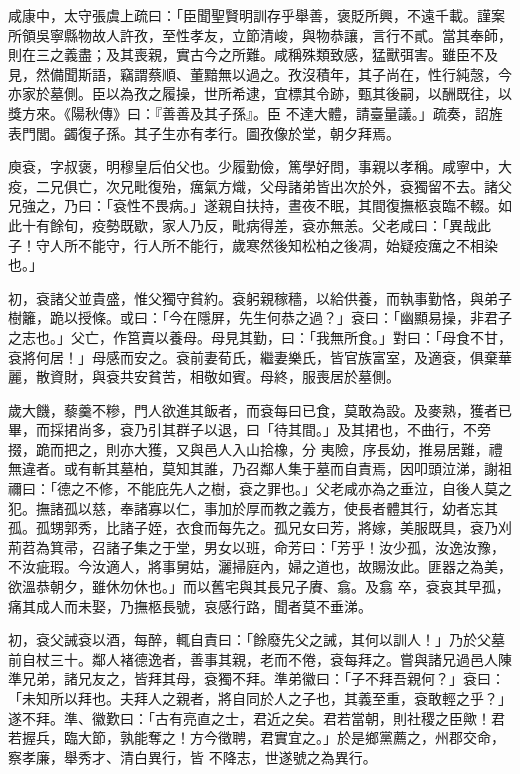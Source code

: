 \begin{pinyinscope}
 咸康中，太守張虞上疏曰：「臣聞聖賢明訓存乎舉善，褒貶所興，不遠千載。謹案所領吳寧縣物故人許孜，至性孝友，立節清峻，與物恭讓，言行不貳。當其奉師，則在三之義盡；及其喪親，實古今之所難。咸稱殊類致感，猛獸弭害。雖臣不及見，然備聞斯語，竊謂蔡順、董黯無以過之。孜沒積年，其子尚在，性行純愨，今亦家於墓側。臣以為孜之履操，世所希逮，宜標其令跡，甄其後嗣，以酬既往，以獎方來。《陽秋傳》曰：『善善及其子孫』。臣
 不達大體，請臺量議。」疏奏，詔旌表門閭。蠲復子孫。其子生亦有孝行。圖孜像於堂，朝夕拜焉。



 庾袞，字叔褒，明穆皇后伯父也。少履勤儉，篤學好問，事親以孝稱。咸寧中，大疫，二兄俱亡，次兄毗復殆，癘氣方熾，父母諸弟皆出次於外，袞獨留不去。諸父兄強之，乃曰：「袞性不畏病。」遂親自扶持，晝夜不眠，其間復撫柩哀臨不輟。如此十有餘旬，疫勢既歇，家人乃反，毗病得差，袞亦無恙。父老咸曰：「異哉此子！守人所不能守，行人所不能行，歲寒然後知松柏之後凋，始疑疫癘之不相染
 也。」



 初，袞諸父並貴盛，惟父獨守貧約。袞躬親稼穡，以給供養，而執事勤恪，與弟子樹籬，跪以授條。或曰：「今在隱屏，先生何恭之過？」袞曰：「幽顯易操，非君子之志也。」父亡，作筥賣以養母。母見其勤，曰：「我無所食。」對曰：「母食不甘，袞將何居！」母感而安之。袞前妻荀氏，繼妻樂氏，皆官族富室，及適袞，俱棄華麗，散資財，與袞共安貧苦，相敬如賓。母終，服喪居於墓側。



 歲大饑，藜羹不糝，門人欲進其飯者，而袞每曰已食，莫敢為設。及麥熟，獲者已畢，而採捃尚多，袞乃引其群子以退，曰「待其間。」及其捃也，不曲行，不旁掇，跪而把之，則亦大獲，又與邑人入山拾橡，分
 夷險，序長幼，推易居難，禮無違者。或有斬其墓柏，莫知其誰，乃召鄰人集于墓而自責焉，因叩頭泣涕，謝祖禰曰：「德之不修，不能庇先人之樹，袞之罪也。」父老咸亦為之垂泣，自後人莫之犯。撫諸孤以慈，奉諸寡以仁，事加於厚而教之義方，使長者體其行，幼者忘其孤。孤甥郭秀，比諸子姪，衣食而每先之。孤兄女曰芳，將嫁，美服既具，袞乃刈荊苕為箕帚，召諸子集之于堂，男女以班，命芳曰：「芳乎！汝少孤，汝逸汝豫，不汝疵瑕。今汝適人，將事舅姑，灑掃庭內，婦之道也，故賜汝此。匪器之為美，欲溫恭朝夕，雖休勿休也。」而以舊宅與其長兄子賡、翕。及翕
 卒，袞哀其早孤，痛其成人而未娶，乃撫柩長號，哀感行路，聞者莫不垂涕。



 初，袞父誡袞以酒，每醉，輒自責曰：「餘廢先父之誡，其何以訓人！」乃於父墓前自杖三十。鄰人褚德逸者，善事其親，老而不倦，袞每拜之。嘗與諸兄過邑人陳準兄弟，諸兄友之，皆拜其母，袞獨不拜。準弟徽曰：「子不拜吾親何？」袞曰：「未知所以拜也。夫拜人之親者，將自同於人之子也，其義至重，袞敢輕之乎？」遂不拜。準、徽歎曰：「古有亮直之士，君近之矣。君若當朝，則社稷之臣歟！君若握兵，臨大節，孰能奪之！方今徵聘，君實宜之。」於是鄉黨薦之，州郡交命，察孝廉，舉秀才、清白異行，皆
 不降志，世遂號之為異行。




\end{pinyinscope}
